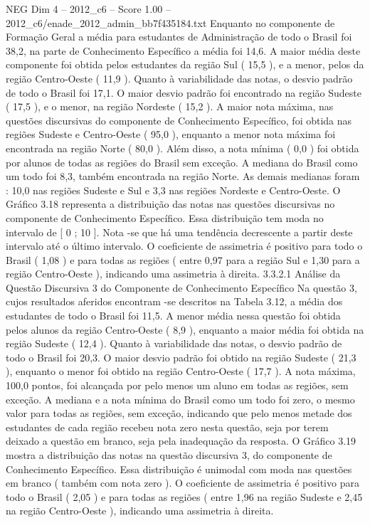\begin{textsample}{NEG Dim 4 – 2012\_c6 – Score 1.00 – 2012\_c6/enade\_2012\_admin\_bb7f435184.txt}
Enquanto no componente de Formação Geral a média para estudantes de Administração de todo o Brasil foi 38,2, na parte de Conhecimento Específico a média foi 14,6.
A maior média deste componente foi obtida pelos estudantes da região Sul ( 15,5 ), e a menor, pelos da região Centro-Oeste ( 11,9 ).
Quanto à variabilidade das notas, o desvio padrão de todo o Brasil foi 17,1.
O maior desvio padrão foi encontrado na região Sudeste ( 17,5 ), e o menor, na região Nordeste ( 15,2 ).
A maior nota máxima, nas questões discursivas do componente de Conhecimento Específico, foi obtida nas regiões Sudeste e Centro-Oeste ( 95,0 ), enquanto a menor nota máxima foi encontrada na região Norte ( 80,0 ).
Além disso, a nota mínima ( 0,0 ) foi obtida por alunos de todas as regiões do Brasil sem exceção.
A mediana do Brasil como um todo foi 8,3, também encontrada na região Norte.
As demais medianas foram : 10,0 nas regiões Sudeste e Sul e 3,3 nas regiões Nordeste e Centro-Oeste.
O Gráfico 3.18 representa a distribuição das notas nas questões discursivas no componente de Conhecimento Específico.
Essa distribuição tem moda no intervalo de [ 0 ; 10 ].
Nota -se que há uma tendência decrescente a partir deste intervalo até o último intervalo.
O coeficiente de assimetria é positivo para todo o Brasil ( 1,08 ) e para todas as regiões ( entre 0,97 para a região Sul e 1,30 para a região Centro-Oeste ), indicando uma assimetria à direita. 3.3.2.1 Análise da Questão Discursiva 3 do Componente de Conhecimento Específico Na questão 3, cujos resultados aferidos encontram -se descritos na Tabela 3.12, a média dos estudantes de todo o Brasil foi 11,5.
A menor média nessa questão foi obtida pelos alunos da região Centro-Oeste ( 8,9 ), enquanto a maior média foi obtida na região Sudeste ( 12,4 ).
Quanto à variabilidade das notas, o desvio padrão de todo o Brasil foi 20,3.
O maior desvio padrão foi obtido na região Sudeste ( 21,3 ), enquanto o menor foi obtido na região Centro-Oeste ( 17,7 ).
A nota máxima, 100,0 pontos, foi alcançada por pelo menos um aluno em todas as regiões, sem exceção.
A mediana e a nota mínima do Brasil como um todo foi zero, o mesmo valor para todas as regiões, sem exceção, indicando que pelo menos metade dos estudantes de cada região recebeu nota zero nesta questão, seja por terem deixado a questão em branco, seja pela inadequação da resposta.
O Gráfico 3.19 mostra a distribuição das notas na questão discursiva 3, do componente de Conhecimento Específico.
Essa distribuição é unimodal com moda nas questões em branco ( também com nota zero ).
O coeficiente de assimetria é positivo para todo o Brasil ( 2,05 ) e para todas as regiões ( entre 1,96 na região Sudeste e 2,45 na região Centro-Oeste ), indicando uma assimetria à direita.

\end{textsample}
